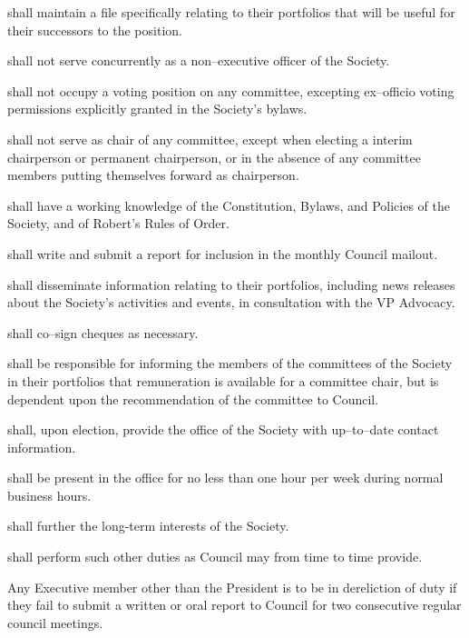 \begin{longenum}[ label*=\thesection.\arabic*., align=left]
    \item shall maintain a file specifically relating to their portfolios that will be useful for their successors to the position.
    \item shall not serve concurrently as a non--executive officer of the Society.
    \item shall not occupy a voting position on any committee, excepting ex--officio voting permissions explicitly granted in the Society's bylaws.
    \begin{longenum}[ label*=\arabic*., align=left]
		\item shall not serve as chair of any committee, except when electing a interim chairperson or permanent chairperson, or in the absence of any committee members putting themselves forward as chairperson. 
   	\end{longenum}
    \item shall have a working knowledge of the Constitution, Bylaws, and Policies of the Society, and of Robert's Rules of Order.
    \item shall write and submit a report for inclusion in the monthly Council mailout.
    \item shall disseminate information relating to their portfolios, including news releases about the Society's activities and events, in consultation with the VP Advocacy.
    \item shall co--sign cheques as necessary.  
    \item shall be responsible for informing the members of the committees of the Society in their portfolios that remuneration is available for a committee chair, but is dependent upon the recommendation of the committee to Council.
    \item shall, upon election, provide the office of the Society with up--to--date contact information. 
    \item shall be present in the office for no less than one hour per week during normal business hours.
    \item shall further the long-term interests of the Society.
    \item shall perform such other duties as Council may from time to time provide.
    \item Any Executive member other than the President is to be in dereliction of duty if they fail to submit a written or oral report to Council for two consecutive regular council meetings.
\end{longenum}
